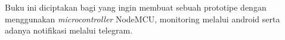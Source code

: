 Buku ini diciptakan bagi yang ingin membuat sebuah prototipe dengan menggunakan \textit{microcontroller} NodeMCU, monitoring melalui android serta adanya notifikasi melalui telegram.

